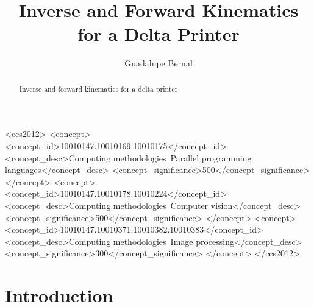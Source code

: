 \documentclass[sigconf]{acmart}
\begin{document}
\title{Inverse and Forward Kinematics for a Delta Printer}

\author{Guadalupe Bernal}
\affiliation{%
  \institution{}
}

\renewcommand{\shortauthors}{B.Ashbaugh, A.Bernal}


\begin{abstract}
	Inverse and forward kinematics for a delta printer
\end{abstract}

%
%                                          
\begin{CCSXML}
	<ccs2012>
	<concept>
	<concept_id>10010147.10010169.10010175</concept_id>
	<concept_desc>Computing methodologies~Parallel programming languages</concept_desc>
	<concept_significance>500</concept_significance>
	</concept>
	<concept>
	<concept_id>10010147.10010178.10010224</concept_id>
	<concept_desc>Computing methodologies~Computer vision</concept_desc>
	<concept_significance>500</concept_significance>
	</concept>
	<concept>
	<concept_id>10010147.10010371.10010382.10010383</concept_id>
	<concept_desc>Computing methodologies~Image processing</concept_desc>
	<concept_significance>300</concept_significance>
	</concept>
	</ccs2012>
\end{CCSXML}




\maketitle

\section{Introduction}
\end{document}
